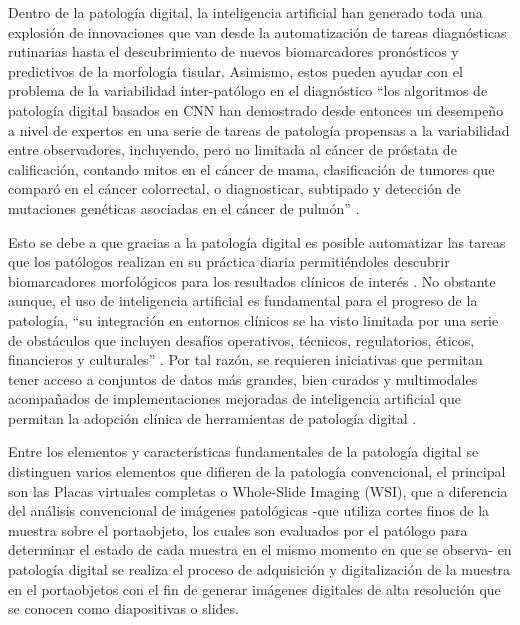 \documentclass[12pt,letterpaper,final, openany]{scrbook}
\begin{document}
Dentro de la patología digital, la inteligencia artificial han generado toda una explosión de innovaciones que van desde la automatización de tareas diagnósticas rutinarias hasta el descubrimiento de nuevos biomarcadores pronósticos y predictivos de la morfología tisular\cite{verghese_computational_2023}. Asimismo, estos pueden ayudar con el problema de la variabilidad inter-patólogo en el diagnóstico ``los algoritmos de patología digital basados en CNN han demostrado desde entonces un desempeño a nivel de expertos en una serie de tareas de patología propensas a la variabilidad entre observadores, incluyendo, pero no limitada al cáncer de próstata de calificación, contando mitos en el cáncer de mama, clasificación de tumores que comparó en el cáncer colorrectal, o diagnosticar, subtipado y detección de mutaciones genéticas asociadas en el cáncer de pulmón” \cite{verghese_computational_2023}.


Esto se debe a que gracias a la patología digital es posible automatizar las tareas que los patólogos realizan en su práctica diaria permitiéndoles descubrir biomarcadores morfológicos para los resultados clínicos de interés \cite{song_artificial_2023}. No obstante aunque, el uso de inteligencia artificial es fundamental para el progreso de la patología, “su integración en entornos clínicos se ha visto limitada por una serie de obstáculos que incluyen desafíos operativos, técnicos, regulatorios, éticos, financieros y culturales” \cite{verghese_computational_2023}. Por tal razón, se requieren iniciativas que permitan tener acceso a conjuntos de datos más grandes, bien curados y multimodales acompañados de implementaciones mejoradas de inteligencia artificial que permitan la adopción clínica de herramientas de patología digital \cite{song_artificial_2023}.

Entre los elementos y características fundamentales de la patología digital se distinguen varios elementos que difieren de la patología convencional, el principal son las Placas virtuales completas o Whole-Slide Imaging (WSI), que a diferencia del análisis convencional de imágenes patológicas -que utiliza cortes finos de la muestra sobre el portaobjeto, los cuales son evaluados por el patólogo para determinar el estado de cada muestra en el mismo momento en que se observa- en patología digital se realiza el proceso de adquisición y digitalización de la muestra en el portaobjetos con el fin de generar imágenes digitales de alta resolución que se conocen como diapositivas o slides.
\end{document}
